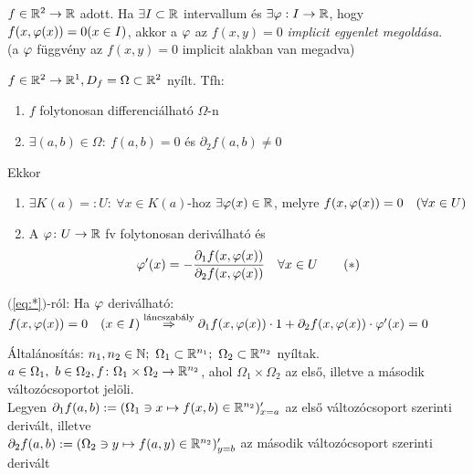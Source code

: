 \begin{de}$f\in\mathbb{R}^2\to\mathbb{R}$ adott. Ha $\exists I\subset \mathbb{R}$ intervallum és $\exists \varphi: I\to\mathbb{R}$, hogy\\ $f(x,\varphi(x))=0
  (x\in I)$, akkor a $\varphi$ az $f(x,y) =0$ \emph{implicit egyenlet megoldása}.\\ (a $\varphi$ függvény az $f(x,y)=0$
  implicit alakban van megadva)
\end{de}

\newpage
\begin{te} $f\in\mathbb{R}^2\to\mathbb{R}^1,\\D_f=\Omega\subset\mathbb{R}^2$ nyílt. Tfh:
  {\listazjromai \begin{enumerate}
  \item $f$ folytonosan differenciálható $\Omega$-n
  \item $\exists (a,b) \in \Omega:\ f(a,b)=0$ és $\partial_2f(a,b)\neq 0$
  \end{enumerate}}
  Ekkor
  {\listazjbetu
    \begin{enumerate}
    \item $\exists K(a) =: U\colon\ \forall x\in K(a)$-hoz $\exists \varphi(x)\in \mathbb{R}$, melyre $f(x,\varphi(x)) = 0\quad(\forall
      x\in U)$
    \item A $\varphi\colon U\to\mathbb{R}$ fv folytonosan deriválható és
      \[\varphi'(x) = - \dfrac{\partial_1f(x,\varphi(x))}{\partial_2f(x,\varphi(x))}\quad \forall x\in U \tag{$*$}\label{eq:*}\]
    \end{enumerate}
  }
\end{te}

\begin{Megj}
\item $($\ref{eq:*}$)$-ról: Ha $\varphi$ deriválható: $f(x,\varphi(x))=0\quad(x\in I) \stackrel{\text{láncszabály}}{\Rightarrow}\\
  \partial_1f(x,\varphi(x))\cdot1 + \partial_2f(x,\varphi(x))\cdot\varphi'(x) = 0$ 
\item Általánosítás: $n_1,n_2\in\N;\ \Omega_1\subset\R^{n_1};\ \Omega_2\subset\R^{n_2}$ nyíltak. $a\in\Omega_1,\
  b\in\Omega_2,\\ f\colon \Omega_1\times\Omega_2\to\mathbb{R}^{n_2}$, ahol $\Omega_1 \times \Omega_2$ az első, illetve a második
  változócsoportot jelöli.\\
  Legyen $\partial_1f(a,b) := (\Omega_1\owns x\mapsto f(x,b)\in\mathbb{R}^{n_2})'_{x=a}$ az első változócsoport szerinti
  derivált, illetve\\$\partial_2f(a,b) := (\Omega_2\owns y\mapsto f(a,y)\in\mathbb{R}^{n_2})'_{y=b}$ az második
  változócsoport szerinti derivált
\end{Megj}

